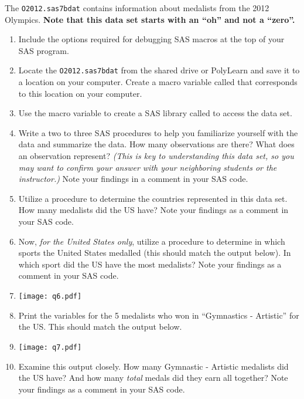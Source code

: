





\vskip10pt
The \texttt{O2012.sas7bdat} contains information about medalists from the 2012 Olympics.  \textbf{Note that this data set starts with an ``oh'' and not a ``zero''.}
\vskip5pt
\begin{enumerate}
\item Include the options required for debugging SAS macros at the top of your SAS program.
\item Locate the \texttt{O2012.sas7bdat} from the shared drive or PolyLearn and save it to a location on your computer.  Create a macro variable called  that corresponds to this location on your computer.
\item Use the  macro variable to create a SAS library called  to access the  data set.
\item Write a two to three SAS procedures to help you familiarize yourself with the data and summarize the data. How many observations are there? What does an observation represent?  \emph{(This is key to understanding this data set, so you may want to confirm your answer with your neighboring students or the instructor.)}  Note your findings in a comment in your SAS code.
\item Utilize a procedure to determine the countries represented in this data set.  How many medalists did the US have?  Note your findings as a comment in your SAS code.
\item Now, \emph{for the United States only}, utilize a procedure to determine in which sports the United States medalled (this should match the output below).  In which sport did the US have the most medalists?  Note your findings as a comment in your SAS code.
\item[]\texttt{[image: q6.pdf]}
\item Print the variables  for the 5 medalists who won in ``Gymnastics - Artistic'' for the US.  This should match the output below.
\item[]\texttt{[image: q7.pdf]}
\item[] Examine this output closely.  How many Gymnastic - Artistic medalists did the US have?  And how many \emph{total} medals did they earn all together?  Note your findings as a comment in your SAS code.

\end{enumerate}
